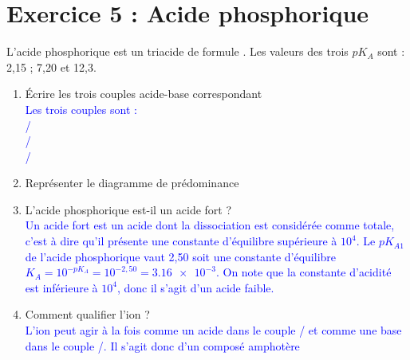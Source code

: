 \documentclass[a4paper,12pt]{article}
\begin{document}
\section*{Exercice 5 : Acide phosphorique}
L'acide phosphorique est un triacide de formule . Les valeurs des trois $pK_A$ sont : 2,15 ; 7,20 et 12,3.
\begin{enumerate}
	\item Écrire les trois couples acide-base correspondant\\
	\textcolor{blue}{Les trois couples sont :\\
	/\\
	/\\
	/}
	\item Représenter le diagramme de prédominance\\
\begin{center}
\end{center}
	\item L'acide phosphorique est-il un acide fort ?\\
	\textcolor{blue}{Un acide fort est un acide dont la dissociation est considérée comme totale, c'est à dire qu'il présente une constante d'équilibre supérieure à $10^4$. Le $pK_{A1}$ de l'acide phosphorique vaut 2,50 soit une constante d'équilibre $K_A = 10^{-pK_A} = 10^{-2,50} =\num{3,16e-3}$. On note que la constante d'acidité est inférieure à $10^4$, donc il s'agit d'un acide faible.}
	\item Comment qualifier l'ion  ?\\
	\textcolor{blue}{L'ion  peut agir à la fois comme un acide dans le couple / et comme une base dans le couple /. Il s'agit donc d'un composé amphotère}
\end{enumerate}
\end{document}
